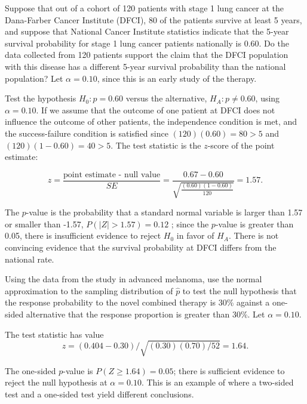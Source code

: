 \begin{example}{Suppose that out of a cohort of 120 patients with stage 1 lung cancer at the Dana-Farber Cancer Institute (DFCI), 80 of the patients survive at least 5 years, and suppose that National Cancer Institute statistics indicate that the 5-year survival probability for stage 1 lung cancer patients nationally is 0.60. Do the data collected from 120 patients support the claim that the DFCI population with this disease has a different 5-year survival probability than the national population? Let $\alpha = 0.10$, since this is an early study of the therapy.}

Test the hypothesis $H_0: p = 0.60$ versus the alternative, $H_A:  p \neq 0.60$, using $\alpha = 0.10$. If we assume that the outcome of one patient at DFCI does not influence the outcome of other patients, the independence condition is met, and the success-failure condition is satisfied since $(120)(0.60) = 80 > 5$ and $(120)(1-0.60) = 40 > 5.$ The test statistic is the $z$-score of the point estimate: 

\[z = \dfrac{\text{point estimate - null value}}{SE} = \dfrac{0.67 - 0.60}{\sqrt{\frac{(0.60)(1-0.60)}{120}}} = 1.57. \]

The $p$-value is the probability that a standard normal variable is larger than 1.57 or smaller than -1.57, $P(|Z| > 1.57) = 0.12$ ; since the $p$-value is greater than 0.05, there is insufficient evidence to reject $H_0$ in favor of $H_A$. There is not convincing evidence that the survival probability at DFCI differs from the national rate.

\end{example}

\begin{example} {Using the data from the study in advanced melanoma, use the normal approximation to the sampling distribution of $\hat{p}$ to test the null hypothesis that the response probability to the novel combined therapy is 30\% against a one-sided alternative that the response proportion is greater than 30\%. Let $\alpha = 0.10$.}

The test statistic has value 
\[
z = (0.404 - 0.30)/\sqrt{(0.30)(0.70)/52} = 1.64. 
\] 

The one-sided $p$-value is $P(Z \geq 1.64) = 0.05$; there is sufficient evidence to reject the null hypothesis at $\alpha = 0.10$. This is an example of where a two-sided test and a one-sided test yield different conclusions. 

\end{example}

